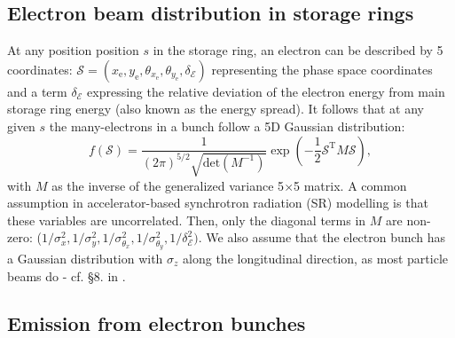 \documentclass{iucr}              %
\newcommand{\todo}[1]{{\color{red}[TODO: "#1'']}}
\begin{document}
\subsection{Electron beam distribution in storage rings}
\label{sec:electronbeam}


At any position position $s$ in the storage ring, an electron can be described by 5 coordinates:
$\mathcal{S}= (x_\text{e},y_\text{e},  \theta_{x_\text{e}}, \theta_{y_\text{e}},\delta_\mathcal{E})$ representing the phase space coordinates and a term $\delta_\mathcal{E}$ expressing the relative deviation of the electron energy from main storage ring energy (also known as the energy spread). It follows that at any given $s$ the many-electrons in a bunch follow a 5D Gaussian distribution:
\begin{equation}\label{eq:f-electrons}
f(\mathcal{S}) = \frac{1}{(2 \pi)^{5/2} \sqrt{\text{det}(M^{-1})}} \exp
        \left( -\frac{1}{2} \mathcal{S}^\text{T} M \mathcal{S} \right),
\end{equation}
with $M$ as the inverse of the generalized variance 5$\times$5 matrix. A common assumption in accelerator-based synchrotron radiation (SR) modelling is that these variables are uncorrelated. Then, only the diagonal terms in $M$ are non-zero: ($1/\sigma_x^2,1/\sigma_y^2,1/\sigma_{\theta_x}^2,1/\sigma_{\theta_y}^2,1/\delta_\mathcal{E}^2)$. We also assume that the electron bunch has a Gaussian distribution with $\sigma_z$ along the longitudinal direction, as most particle beams do - cf. \S8. in \cite{Wiedemann2015}.

 

\subsection{Emission from electron bunches}
\end{document}
